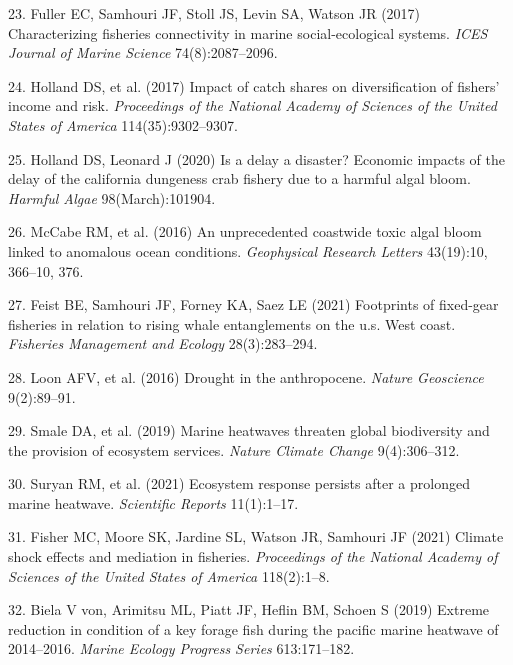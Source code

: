 \documentclass[9pt,twocolumn,twoside,lineno]{pnas-new}
\begin{document}
\leavevmode\hypertarget{ref-Fuller2017}{}%
23. Fuller EC, Samhouri JF, Stoll JS, Levin SA, Watson JR (2017)
Characterizing fisheries connectivity in marine social-ecological
systems. \emph{ICES Journal of Marine Science} 74(8):2087--2096.

\leavevmode\hypertarget{ref-Holland2017}{}%
24. Holland DS, et al. (2017) Impact of catch shares on diversification
of fishers' income and risk. \emph{Proceedings of the National Academy
of Sciences of the United States of America} 114(35):9302--9307.

\leavevmode\hypertarget{ref-Holland2020a}{}%
25. Holland DS, Leonard J (2020) Is a delay a disaster? Economic impacts
of the delay of the california dungeness crab fishery due to a harmful
algal bloom. \emph{Harmful Algae} 98(March):101904.

\leavevmode\hypertarget{ref-McCabe2016a}{}%
26. McCabe RM, et al. (2016) An unprecedented coastwide toxic algal
bloom linked to anomalous ocean conditions. \emph{Geophysical Research
Letters} 43(19):10, 366--10, 376.

\leavevmode\hypertarget{ref-Feist2021}{}%
27. Feist BE, Samhouri JF, Forney KA, Saez LE (2021) Footprints of
fixed-gear fisheries in relation to rising whale entanglements on the
u.s. West coast. \emph{Fisheries Management and Ecology} 28(3):283--294.

\leavevmode\hypertarget{ref-VanLoon2016}{}%
28. Loon AFV, et al. (2016) Drought in the anthropocene. \emph{Nature
Geoscience} 9(2):89--91.

\leavevmode\hypertarget{ref-Smale2019}{}%
29. Smale DA, et al. (2019) Marine heatwaves threaten global
biodiversity and the provision of ecosystem services. \emph{Nature
Climate Change} 9(4):306--312.

\leavevmode\hypertarget{ref-Suryan2021}{}%
30. Suryan RM, et al. (2021) Ecosystem response persists after a
prolonged marine heatwave. \emph{Scientific Reports} 11(1):1--17.

\leavevmode\hypertarget{ref-Fisher2021}{}%
31. Fisher MC, Moore SK, Jardine SL, Watson JR, Samhouri JF (2021)
Climate shock effects and mediation in fisheries. \emph{Proceedings of
the National Academy of Sciences of the United States of America}
118(2):1--8.

\leavevmode\hypertarget{ref-VonBiela2019}{}%
32. Biela V von, Arimitsu ML, Piatt JF, Heflin BM, Schoen S (2019)
Extreme reduction in condition of a key forage fish during the pacific
marine heatwave of 2014--2016. \emph{Marine Ecology Progress Series}
613:171--182.
\end{document}
